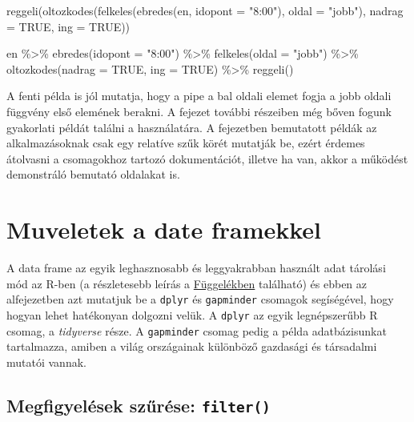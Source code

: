 \documentclass[
]{book}
\newenvironment{Shaded}{\begin{snugshade}}{\end{snugshade}}
\newcommand{\AttributeTok}[1]{\textcolor[rgb]{0.77,0.63,0.00}{#1}}
\newcommand{\ConstantTok}[1]{\textcolor[rgb]{0.00,0.00,0.00}{#1}}
\newcommand{\FunctionTok}[1]{\textcolor[rgb]{0.00,0.00,0.00}{#1}}
\newcommand{\NormalTok}[1]{#1}
\newcommand{\SpecialCharTok}[1]{\textcolor[rgb]{0.00,0.00,0.00}{#1}}
\newcommand{\StringTok}[1]{\textcolor[rgb]{0.31,0.60,0.02}{#1}}
\begin{document}
\begin{Shaded}
\begin{Highlighting}[]
\FunctionTok{reggeli}\NormalTok{(}\FunctionTok{oltozkodes}\NormalTok{(}\FunctionTok{felkeles}\NormalTok{(}\FunctionTok{ebredes}\NormalTok{(en, }\AttributeTok{idopont =} \StringTok{"8:00"}\NormalTok{), }\AttributeTok{oldal =} \StringTok{"jobb"}\NormalTok{), }\AttributeTok{nadrag =} \ConstantTok{TRUE}\NormalTok{, }
    \AttributeTok{ing =} \ConstantTok{TRUE}\NormalTok{))}

\NormalTok{en }\SpecialCharTok{\%\textgreater{}\%} \FunctionTok{ebredes}\NormalTok{(}\AttributeTok{idopont =} \StringTok{"8:00"}\NormalTok{) }\SpecialCharTok{\%\textgreater{}\%} \FunctionTok{felkeles}\NormalTok{(}\AttributeTok{oldal =} \StringTok{"jobb"}\NormalTok{) }\SpecialCharTok{\%\textgreater{}\%} \FunctionTok{oltozkodes}\NormalTok{(}\AttributeTok{nadrag =} \ConstantTok{TRUE}\NormalTok{, }
    \AttributeTok{ing =} \ConstantTok{TRUE}\NormalTok{) }\SpecialCharTok{\%\textgreater{}\%} \FunctionTok{reggeli}\NormalTok{()}
\end{Highlighting}
\end{Shaded}

A fenti példa is jól mutatja, hogy a pipe a bal oldali elemet fogja a
jobb oldali függvény első elemének berakni. A fejezet további részeiben
még bőven fogunk gyakorlati példát találni a használatára. A fejezetben
bemutatott példák az alkalmazásoknak csak egy relatíve szűk körét
mutatják be, ezért érdemes átolvasni a csomagokhoz tartozó
dokumentációt, illetve ha van, akkor a működést demonstráló bemutató
oldalakat is.

\hypertarget{muveletek-a-date-framekkel}{%
\section{Muveletek a date framekkel}\label{muveletek-a-date-framekkel}}

A data frame az egyik leghasznosabb és leggyakrabban használt adat
tárolási mód az R-ben (a részletesebb leírás a
\protect\hyperlink{data-frame}{Függelékben} található) és ebben az
alfejezetben azt mutatjuk be a \texttt{dplyr} és \texttt{gapminder}
csomagok segíségével, hogy hogyan lehet hatékonyan dolgozni velük. A
\texttt{dplyr} az egyik legnépszerűbb R csomag, a \emph{tidyverse}
része. A \texttt{gapminder} csomag pedig a példa adatbázisunkat
tartalmazza, amiben a világ országainak különböző gazdasági és
társadalmi mutatói vannak.

\hypertarget{megfigyeluxe9sek-szux171ruxe9se-filter}{%
\subsection{\texorpdfstring{Megfigyelések szűrése:
\texttt{filter()}}{Megfigyelések szűrése: filter()}}\label{megfigyeluxe9sek-szux171ruxe9se-filter}}
\end{document}
